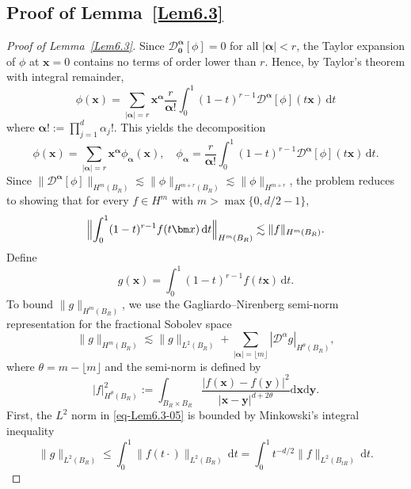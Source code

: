 \documentclass{sn-jnl}%
\newcommand{\dt}{\,\mathrm{d}t}
\numberwithin{equation}{section}
\theoremstyle{thmstyleone}%
\theoremstyle{thmstyletwo}%
\theoremstyle{thmstylethree}%
\begin{document}
\begin{appendices}
\section{Proof of Lemma~\ref{Lem6.3}}\label{prooflem2}
\begin{proof}[Proof of Lemma~\ref{Lem6.3}]
Since $\mathcal{D}^{\bm \alpha}_{\bm 0}[\phi]=0$ for all $|\bm \alpha|<r$, the Taylor expansion of $\phi$ at $\bm x=0$ contains no terms of order lower than $r$. Hence, by Taylor's theorem with integral remainder,
\begin{equation}\label{eq-Lem6.3-02}
\phi(\bm x)
=
\sum_{|\bm \alpha|=r}
\bm x^{\bm \alpha}\frac{r}{\bm \alpha!}
\int_0^1
(1-t)^{r-1}
\mathcal{D}^{\bm \alpha}[\phi](t\bm x)\dt
\end{equation}
where $\bm \alpha!:= \prod_{j=1}^{d}\alpha_j!$.
This yields the decomposition
\begin{equation}\label{eq-Lem6.3-03}
    \phi(\bm x)= \sum_{|\bm \alpha|=r} \bm x^{\bm \alpha}\phi_{\bm \alpha}(\bm x), \quad \phi_{\bm \alpha}= \frac{r}{\bm \alpha!} \int_0^1 (1-t)^{r-1}\mathcal{D}^{\bm \alpha}[\phi](t\bm x)\dt.
\end{equation}
Since $\bigl\|\mathcal{D}^{\bm \alpha}[\phi]\bigr\|_{H^{m}(B_R)}\lesssim \bigl\|\phi\bigr\|_{H^{m+r}(B_R)}\lesssim \|\phi\|_{H^{m+r}}$, the problem reduces to showing that for every $f \in H^{m}$ with $m>\max \{0,d/2-1\}$,
\begin{equation}\label{eq-Lem6.3-04}
    \Bigl\|\int_{0}^1(1-t)^{r-1}f(t\bm x)\dt\Bigr\|_{H^{m}(B_R)}\lesssim \|f\|_{H^{m}(B_R)}.
\end{equation}
Define 
\begin{equation}
 g(\bm x) = \int_{0}^1(1-t)^{r-1}f(t\bm x)\dt.   
\end{equation}
To bound $\|g\|_{H^{m}(B_R)}$, we use the Gagliardo–Nirenberg semi-norm representation for the fractional Sobolev space
\begin{equation}\label{eq-Lem6.3-05}
    \|g\|_{H^{m}(B_R)} \lesssim \|g\|_{L^{2}(B_R)}+\sum_{|\bm \alpha|=\lfloor m\rfloor}|\mathcal{D}^{\alpha}g|_{H^{\theta}(B_R)},
\end{equation}
where $\theta = m-\lfloor m\rfloor$ and the semi-norm is defined by
\[
    |f|_{H^{\theta}(B_R)}^2 := 
    \int_{B_R\times B_R}\frac{\bigl|f(\bm x)-f(\bm y)\bigr|^2}{|\bm x -\bm y|^{d+2\theta}}\mathrm{d} \bm x\mathrm{d}\bm y.
\]
First, the $L^2$ norm in \eqref{eq-Lem6.3-05} is bounded by Minkowski's integral inequality
\begin{equation}\label{eq-Lem6.3-06}
    \|g\|_{L^2(B_R)}\leq\int_0^1 \|f(t\cdot)\|_{L^{2}(B_R)}\dt = \int_{0}^{1}t^{-d/2}\|f\|_{L^{2}(B_{tR})}\dt.

\end{equation}
\end{proof}
\end{appendices}
\end{document}
